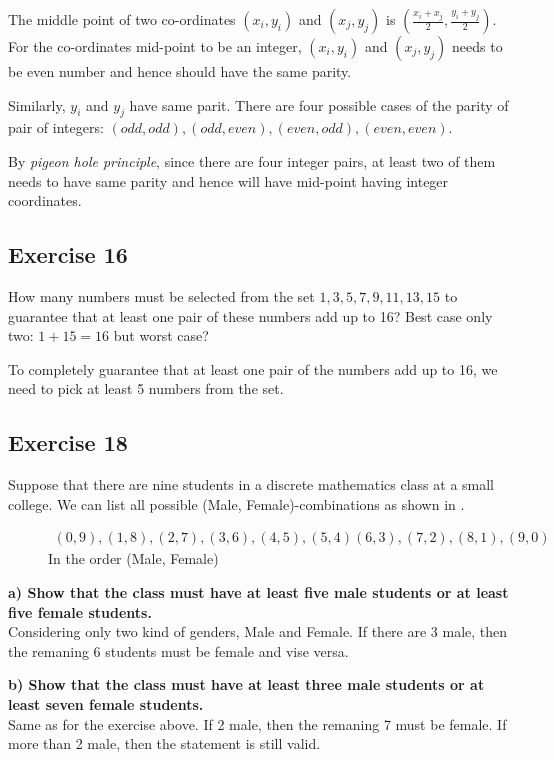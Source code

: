 \documentclass[12pt]{article}
\begin{document}
    The middle point of two co-ordinates $(x_i,y_i)$ and $(x_j,y_j)$ is $(\frac{x_i+x_j}{2},\frac{y_i+y_j}{2})$. For the co-ordinates mid-point to be an integer,  $(x_i,y_i)$ and $(x_j,y_j)$ needs to be even number and hence should have the same parity.

    Similarly, $y_i$ and $y_j$ have same parit. There are four possible cases of the parity of pair of integers: $(odd,odd),(odd,even),(even,odd),(even,even)$.

    By \textit{pigeon hole principle}, since there are four integer pairs, at least two of them needs to have same parity and hence will have mid-point having integer coordinates.

    \subsection{Exercise 16}
    How many numbers must be selected from the set ${1, 3, 5, 7, 9, 11, 13, 15}$ to guarantee that at least one pair of these numbers add up to 16?
    Best case only two: $1+15=16$ but worst case?

    To completely guarantee that at least one pair of the numbers add up to 16, we need to pick at least 5 numbers from the set.

    \subsection{Exercise 18}
    Suppose that there are nine students in a discrete mathematics class at a small college. We can list all possible (Male, Female)-combinations as shown in .
   \begin{figure}[h]
    \label{fig:groupings}
    \begin{equation}
      \begin{split}
        (0,9),(1,8),(2,7),(3,6),(4,5),(5,4)(6,3),(7,2),(8,1),(9,0)
      \end{split}
    \end{equation}
    \centering
    In the order (Male, Female)
  \end{figure}
   
    \textbf{a) Show that the class must have at least five male students or at least five female students.}\\
    Considering only two kind of genders, Male and Female. If there are 3 male, then the remaning 6 students must be female and vise versa.

    \textbf{b) Show that the class must have at least three male students or at least seven female students.}\\
    Same as for the exercise above. If 2 male, then the remaning 7 must be female. If more than 2 male, then the statement is still valid.
    
\end{document}
